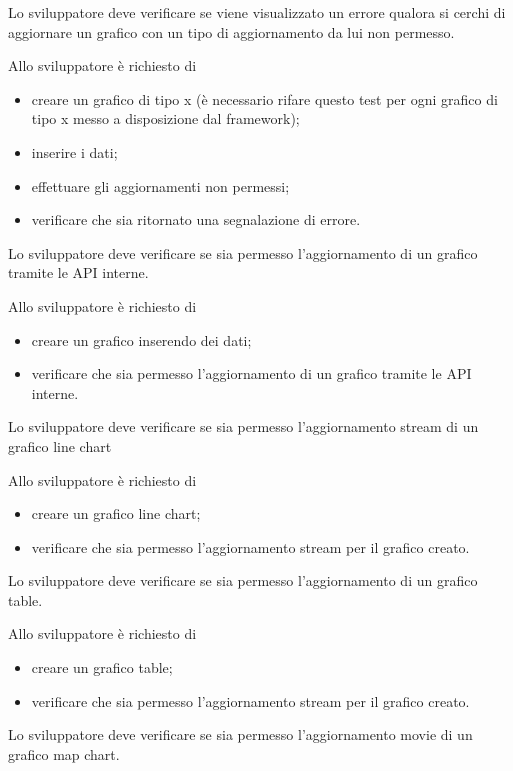 	Lo sviluppatore deve verificare se viene visualizzato un errore qualora si cerchi di aggiornare un grafico con un tipo di aggiornamento da lui non permesso.

		Allo sviluppatore è richiesto di
		\begin{itemize}
			\item creare un grafico di tipo x (è necessario rifare questo test per ogni grafico di tipo x messo a disposizione dal framework);
			\item inserire i dati;
			\item effettuare gli aggiornamenti non permessi;
			\item verificare che sia ritornato una segnalazione di errore.
		\end{itemize}

	Lo sviluppatore deve verificare se sia permesso l'aggiornamento di un grafico tramite le API interne.
		
		Allo sviluppatore è richiesto di
		\begin{itemize}
			\item creare un grafico inserendo dei dati;
			\item verificare che sia permesso l'aggiornamento di un grafico tramite le API interne.
		\end{itemize}

	Lo sviluppatore deve verificare se sia permesso l'aggiornamento stream di un grafico line chart
		
		Allo sviluppatore è richiesto di
		\begin{itemize}
			\item creare un grafico line chart;
			\item verificare che sia permesso l'aggiornamento stream per il grafico creato.
		\end{itemize}

	Lo sviluppatore deve verificare se sia permesso l'aggiornamento di un grafico table.
		
		Allo sviluppatore è richiesto di
		\begin{itemize}
			\item creare un grafico table;
			\item verificare che sia permesso l'aggiornamento stream per il grafico creato.
		\end{itemize}

	Lo sviluppatore deve verificare se sia permesso l'aggiornamento movie di un grafico map chart.
		
